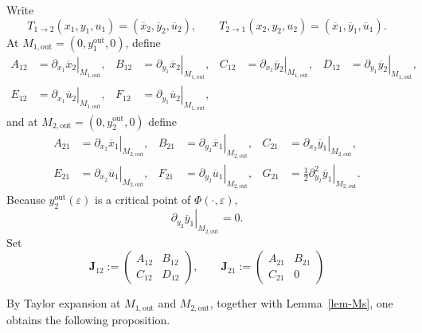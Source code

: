 \documentclass[11pt,a4paper]{article}
\theoremstyle{plain}
\theoremstyle{definition}
\theoremstyle{plain}
\numberwithin{equation}{section}
\begin{document}
Write
\[
T_{1 \to 2}(x_1,y_1,u_1) = (\overline{x}_2,\overline{y}_2,\overline{u}_2),
\qquad
T_{2 \to 1}(x_2,y_2,u_2) = (\overline{x}_1,\overline{y}_1,\overline{u}_1).
\]
At $M_{1,\mathrm{out}} = (0,y_1^\mathrm{out},0)$, define
\begin{align*}
A_{12} &= \left.\partial_{x_1}\overline{x}_2\right|_{M_{1,\mathrm{out}}}, &
B_{12} &= \left.\partial_{y_1}\overline{x}_2\right|_{M_{1,\mathrm{out}}}, &
C_{12} &= \left.\partial_{x_1}\overline{y}_2\right|_{M_{1,\mathrm{out}}}, &
D_{12} &= \left.\partial_{y_1}\overline{y}_2\right|_{M_{1,\mathrm{out}}}, \\
E_{12} &= \left.\partial_{x_1}\overline{u}_2\right|_{M_{1,\mathrm{out}}}, &
F_{12} &= \left.\partial_{y_1}\overline{u}_2\right|_{M_{1,\mathrm{out}}},
\end{align*}
and at $M_{2,\mathrm{out}} = (0,y_2^\mathrm{out},0)$ define
\begin{align*}
A_{21} &= \left.\partial_{x_2}\overline{x}_1\right|_{M_{2,\mathrm{out}}}, &
B_{21} &= \left.\partial_{y_2}\overline{x}_1\right|_{M_{2,\mathrm{out}}}, &
C_{21} &= \left.\partial_{x_2}\overline{y}_1\right|_{M_{2,\mathrm{out}}}, \\
E_{21} &= \left.\partial_{x_2}\overline{u}_1\right|_{M_{2,\mathrm{out}}}, &
F_{21} &= \left.\partial_{y_2}\overline{u}_1\right|_{M_{2,\mathrm{out}}}, &
G_{21} &= \frac12\left.\partial_{y_2}^2\overline{y}_1\right|_{M_{2,\mathrm{out}}}.
\end{align*}
Because $y_2^\mathrm{out}(\varepsilon)$ is a critical point of $\Phi(\cdot,\varepsilon)$,
\[
\left.\partial_{y_2}\overline{y}_1\right|_{M_{2,\mathrm{out}}} = 0.
\]
Set
\[
\mathbf{J}_{12}
:=
\begin{pmatrix}
A_{12} & B_{12} \\
C_{12} & D_{12}
\end{pmatrix},
\qquad
\mathbf{J}_{21}
:=
\begin{pmatrix}
A_{21} & B_{21} \\
C_{21} & 0
\end{pmatrix}
\]

By Taylor expansion at $M_{1,\mathrm{out}}$ and $M_{2,\mathrm{out}}$, together with Lemma~\ref{lem-Ms}, one obtains the following proposition.
\end{document}
